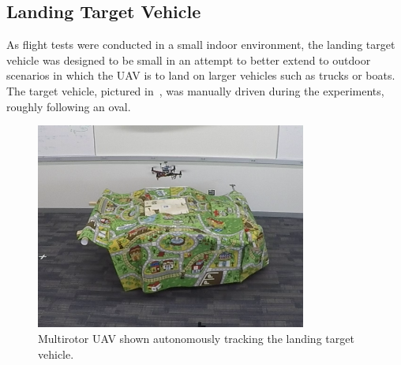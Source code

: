 
\subsection{Landing Target Vehicle}
As flight tests were conducted in a small indoor environment,
the landing target
vehicle was designed to be small in an attempt to better extend to outdoor
scenarios in which the UAV is to land on larger vehicles such as trucks or boats.
The target vehicle, pictured in~, was manually
driven during the experiments,
roughly following an oval.

\begin{figure}
  \centering
  \includegraphics[width=3.5in]{imgs/landing_vehicle.png}
  \caption[UAV Tracking the Target Vehicle During Flight Experiment]{Multirotor
    UAV shown autonomously tracking the landing target
  vehicle.}
  \label{fig:landing_vehicle}
\end{figure}
